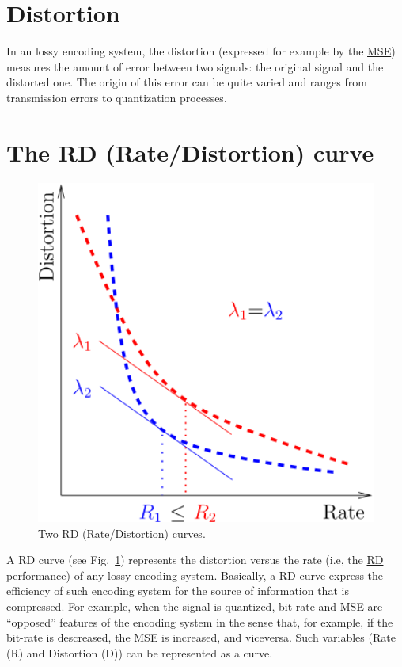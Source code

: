 \section{Distortion}

In an lossy encoding system, the distortion (expressed for example by
the \href{https://en.wikipedia.org/wiki/Mean_squared_error}{MSE})
measures the amount of error between two signals: the original signal
and the distorted one. The origin of this error can be quite varied
and ranges from transmission errors to quantization processes.

\section{The RD (Rate/Distortion) curve}

\begin{figure}
  \centering
  \includegraphics[width=1.0\textwidth]{graphics/RD_slopes} 
  \caption{Two RD (Rate/Distortion) curves.}
  \label{fig:RD_slopes}
\end{figure}

A RD curve (see Fig.~\ref{fig:RD_slopes}) represents the distortion
versus the rate (i.e, the
\href{https://en.wikipedia.org/wiki/Rate-distortion_theory}{RD
  performance}) of any lossy encoding system. Basically, a RD curve
express the efficiency of such encoding system for the source of
information that is compressed. For example, when the signal is
quantized, bit-rate and MSE are ``opposed'' features of the encoding
system in the sense that, for example, if the bit-rate is descreased,
the MSE is increased, and viceversa. Such variables (Rate (R) and
Distortion (D)) can be represented as a curve.

